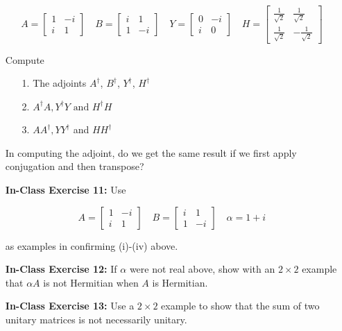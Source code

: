 \documentclass[main.tex]{subfiles}
\begin{document}
\begin{enumerate}
    $$
    A=\left[\begin{array}{cc}
    1 & -i \\
    i & 1
    \end{array}\right] \quad B=\left[\begin{array}{cc}
    i & 1 \\
    1 & -i
    \end{array}\right] \quad Y=\left[\begin{array}{cc}
    0 & -i \\
    i & 0
    \end{array}\right] \quad H=\left[\begin{array}{cc}
    \frac{1}{\sqrt{2}} & \frac{1}{\sqrt{2}} \\
    \frac{1}{\sqrt{2}} & -\frac{1}{\sqrt{2}}
    \end{array}\right]
    $$
    
    Compute
    
    \begin{enumerate}
        \item[1.] The adjoints $A^{\dagger}$, $B^{\dagger}$, $Y^{\dagger}$, $H^{\dagger}$
        \item[2.] $A^{\dagger} A, Y^{\dagger} Y \text{ and } H^{\dagger} H$
        \item[3.] $A A^{\dagger}, Y Y^{\dagger}$ and $H H^{\dagger}$
    \end{enumerate}
    
    In computing the adjoint, do we get the same result if we first apply conjugation and then transpose?

\item[] \textbf{In-Class Exercise 11:} Use

    $$A=\left[\begin{array}{cc}1 & -i \\ i & 1\end{array}\right] \quad B=\left[\begin{array}{cc}i & 1 \\ 1 & -i\end{array}\right] \quad \alpha=1+i$$
    
    as examples in confirming (i)-(iv) above.

\item[] \textbf{In-Class Exercise 12:} If $\alpha$ were not real above, show with an $2 \times 2$ example that $\alpha A$ is not Hermitian when $A$ is Hermitian.

\item[] \textbf{In-Class Exercise 13:} Use a $2 \times 2$ example to show that the sum of two unitary matrices is not necessarily unitary.


\end{enumerate}
\end{document}
